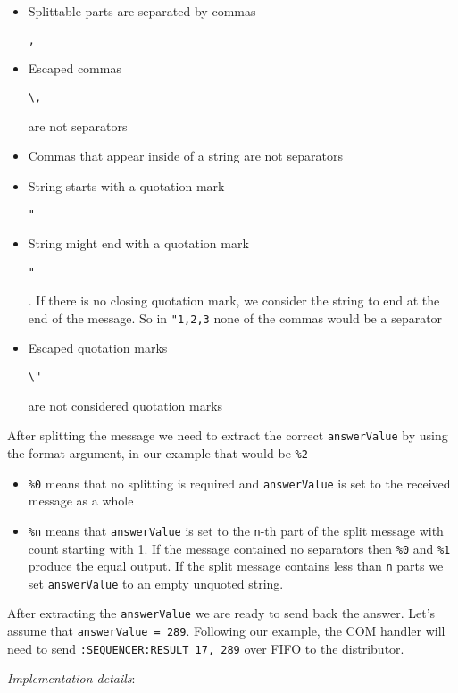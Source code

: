 \begin{itemize}
{{\begin{itemize}
				\item Splittable parts are separated by commas \colorbox{selectioncolor}{\strut \texttt{,}}
				\item Escaped commas \colorbox{selectioncolor}{\strut \texttt{\textbackslash ,}} are not separators
				\item Commas that appear inside of a string are not separators
				\item String starts with a quotation mark \colorbox{selectioncolor}{\strut \texttt{"}}
				\item String might end with a quotation mark \colorbox{selectioncolor}{\strut \texttt{"}}. If there is no closing quotation mark, we consider the string to end at the end of the message. So in \texttt{"1,2,3} none of the commas would be a separator
				\item Escaped quotation marks \colorbox{selectioncolor}{\strut \texttt{\textbackslash "}} are not considered quotation marks
			\end{itemize}
		}
		\item{
			After splitting the message we need to extract the correct \texttt{answerValue} by using the format argument, in our example that would be \texttt{\%2}
			\begin{itemize}
				\item \texttt{\%0} means that no splitting is required and \texttt{answerValue} is set to the received message as a whole
				\item \texttt{\%n} means that \texttt{answerValue} is set to the \texttt{n}-th part of the split message with count starting with 1. If the message contained no separators then \texttt{\%0} and \texttt{\%1} produce the equal output. If the split message contains less than \texttt{n} parts we set \texttt{answerValue} to an empty unquoted string.
			\end{itemize}
		}
		\item After extracting the \texttt{answerValue} we are ready to send back the answer. Let's assume that \texttt{answerValue = 289}. Following our example, the COM handler will need to send \texttt{:SEQUENCER:RESULT 17, 289} over FIFO to the distributor.
	}
\end{itemize}

\textit{Implementation details}:


